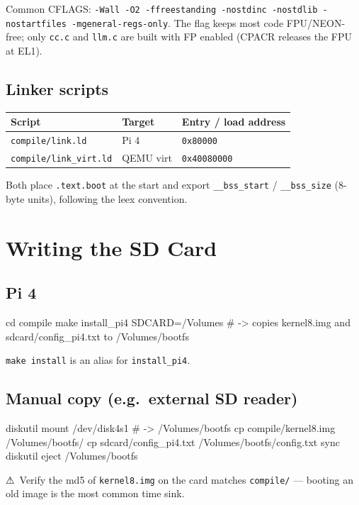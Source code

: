 \documentclass[a4paper,11pt]{article}
\begin{document}
Common CFLAGS:
\verb|-Wall -O2 -ffreestanding -nostdinc -nostdlib -nostartfiles -mgeneral-regs-only|.
The flag keeps most code FPU/NEON-free; only \verb|cc.c| and \verb|llm.c| are
built with FP enabled (CPACR releases the FPU at EL1).

\subsection{Linker scripts}
\begin{center}\footnotesize
\begin{tabular}{@{}l l l@{}}
\toprule
\textbf{Script} & \textbf{Target} & \textbf{Entry / load address}\\
\midrule
\verb|compile/link.ld|      & Pi 4      & \verb|0x80000|\\
\verb|compile/link_virt.ld| & QEMU virt & \verb|0x40080000|\\
\bottomrule
\end{tabular}
\end{center}
Both place \verb|.text.boot| at the start and export \verb|__bss_start| /
\verb|__bss_size| (8-byte units), following the leex convention.

\section{Writing the SD Card}

\subsection{Pi 4}
\begin{code}
cd compile
make install_pi4 SDCARD=/Volumes
# -> copies kernel8.img and sdcard/config_pi4.txt to /Volumes/bootfs
\end{code}
\verb|make install| is an alias for \verb|install_pi4|.

\subsection{Manual copy (e.g.\ external SD reader)}
\begin{code}
diskutil mount /dev/disk4s1                # -> /Volumes/bootfs
cp compile/kernel8.img /Volumes/bootfs/
cp sdcard/config_pi4.txt /Volumes/bootfs/config.txt
sync
diskutil eject /Volumes/bootfs
\end{code}
⚠~Verify the md5 of \verb|kernel8.img| on the card matches \verb|compile/| ---
booting an old image is the most common time sink.
\end{document}
